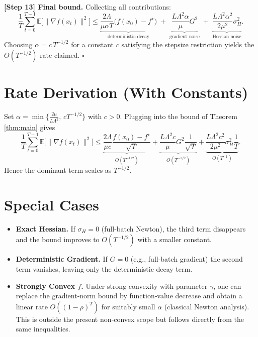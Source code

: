 \documentclass{article}
\begin{document}
\noindent\textbf{[Step 13] Final bound.}
Collecting all contributions:
\[
\frac{1}{T}\sum_{t=0}^{T-1}\mathbb{E}\!\big[\|\nabla f(x_{t})\|^{2}\big]
\le
\underbrace{\frac{2\Lambda}{\mu\alpha T}\big(f(x_{0})-f^{\star}\big)}_{\text{deterministic decay}}
\;+\;
\underbrace{\frac{L\Lambda^{2}\alpha}{\mu}G^{2}}_{\text{gradient noise}}
\;+\;
\underbrace{\frac{L\Lambda^{2}\alpha^{2}}{2\mu^{2}}\sigma_{H}^{2}}_{\text{Hessian noise}}.
\]
Choosing $\alpha = c\,T^{-1/2}$ for a constant $c$ satisfying the stepsize restriction yields the $O(T^{-1/2})$ rate claimed. \hfill $\square$

\section*{Rate Derivation (With Constants)}
Set $\alpha = \min\!\Big\{\frac{2\mu}{L\Lambda^{2}},\,cT^{-1/2}\Big\}$ with $c>0$.  
Plugging into the bound of Theorem \ref{thm:main} gives
\[
\frac{1}{T}\sum_{t=0}^{T-1}\mathbb{E}\!\big[\|\nabla f(x_{t})\|^{2}\big]
\le
\underbrace{\frac{2\Lambda}{\mu c}\frac{f(x_{0})-f^{\star}}{\sqrt{T}}}_{\displaystyle O(T^{-1/2})}
+ \underbrace{\frac{L\Lambda^{2}c}{\mu}G^{2}\frac{1}{\sqrt{T}}}_{\displaystyle O(T^{-1/2})}
+ \underbrace{\frac{L\Lambda^{2}c^{2}}{2\mu^{2}}\sigma_{H}^{2}\frac{1}{T}}_{\displaystyle O(T^{-1})}.
\]
Hence the dominant term scales as $T^{-1/2}$.

\section*{Special Cases}
\begin{itemize}
\item \textbf{Exact Hessian.} If $\sigma_{H}=0$ (full‑batch Newton), the third term disappears and the bound improves to $O(T^{-1/2})$ with a smaller constant.
\item \textbf{Deterministic Gradient.} If $G=0$ (e.g., full‑batch gradient) the second term vanishes, leaving only the deterministic decay term.
\item \textbf{Strongly Convex $f$.} Under strong convexity with parameter $\gamma$, one can replace the gradient‑norm bound by function‑value decrease and obtain a linear rate $O((1-\rho)^{T})$ for suitably small $\alpha$ (classical Newton analysis). This is outside the present non‑convex scope but follows directly from the same inequalities.
\end{itemize}
\end{document}
